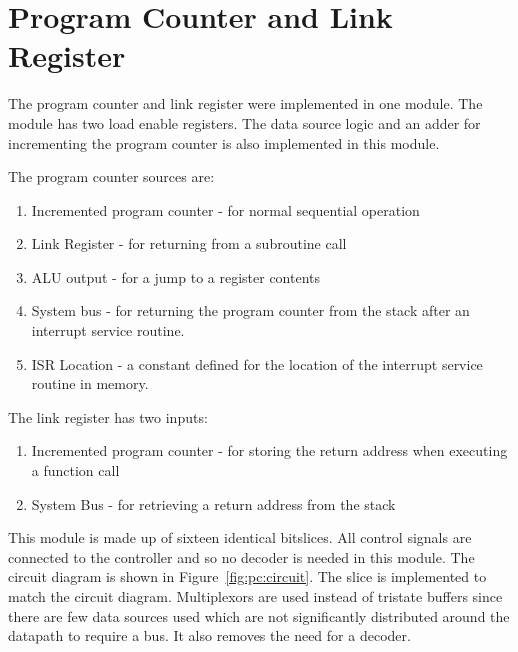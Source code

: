 
\section{Program Counter and Link Register}


The program counter and link register were implemented in one module.
The module has two load enable registers. 
The data source logic and an adder for incrementing the program counter is also implemented in this module.

The program counter sources are:
\begin{enumerate}
\item Incremented program counter - for normal sequential operation
\item Link Register - for returning from a subroutine call
\item ALU output - for a jump to a register contents
\item System bus - for returning the program counter from the stack after an interrupt service routine.
\item ISR Location - a constant defined for the location of the interrupt service routine in memory.
\end{enumerate}

The link register has two inputs:
\begin{enumerate}
\item Incremented program counter - for storing the return address when executing a function call
\item System Bus - for retrieving a return address from the stack 
\end{enumerate}

This module is made up of sixteen identical bitslices. 
All control signals are connected to the controller and so no decoder is needed in this module.
The circuit diagram is shown in Figure~\ref{fig:pc:circuit}.
The slice is implemented to match the circuit diagram. 
Multiplexors are used instead of tristate buffers since there are few data sources used which are not significantly distributed around the datapath to require a bus. 
It also removes the need for a decoder.

